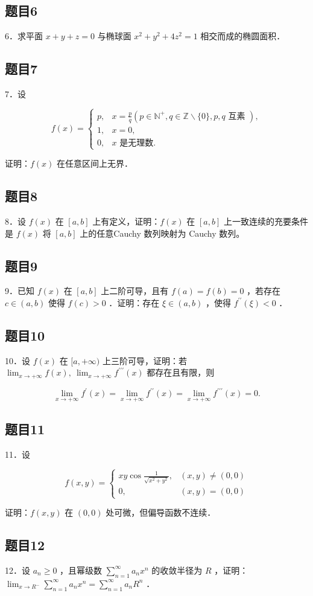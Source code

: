 \documentclass{article}
\begin{document}
\subsection{题目6}
6．求平面 \(x+y+z=0\) 与椭球面 \(x^{2}+y^{2}+4 z^{2}=1\) 相交而成的椭圆面积．

\subsection{题目7}
7．设

\[
f(x)= \begin{cases}p, & x=\frac{p}{q}\left(p \in \mathbb{N}^{+}, q \in \mathbb{Z} \backslash\{0\}, p, q \text { 互素 }\right), \\ 1, & x=0, \\ 0, & x \text { 是无理数. }\end{cases}
\]

证明：\(f(x)\) 在任意区间上无界．

\subsection{题目8}
8．设 \(f(x)\) 在 \([a, b]\) 上有定义，证明：\(f(x)\) 在 \([a, b]\) 上一致连续的充要条件是 \(f(x)\) 将 \([a, b]\) 上的任意Cauchy 数列映射为 Cauchy 数列。

\subsection{题目9}
9．已知 \(f(x)\) 在 \([a, b]\) 上二阶可导，且有 \(f(a)=f(b)=0\) ，若存在 \(c \in(a, b)\) 使得 \(f(c)>0\) ．证明：存在 \(\xi \in(a, b)\) ，使得 \(f^{\prime \prime}(\xi)<0\) ．

\subsection{题目10}
10．设 \(f(x)\) 在 \([a,+\infty)\) 上三阶可导，证明：若 \(\lim _{x \rightarrow+\infty} f(x), ~ \lim _{x \rightarrow+\infty} f^{\prime \prime \prime}(x)\) 都存在且有限，则

\[
\lim _{x \rightarrow+\infty} f^{\prime}(x)=\lim _{x \rightarrow+\infty} f^{\prime \prime}(x)=\lim _{x \rightarrow+\infty} f^{\prime \prime \prime}(x)=0 .
\]

\subsection{题目11}
11．设

\[
f(x, y)= \begin{cases}x y \cos \frac{1}{\sqrt{x^{2}+y^{2}}}, & (x, y) \neq(0,0) \\ 0, & (x, y)=(0,0)\end{cases}
\]

证明：\(f(x, y)\) 在 \((0,0)\) 处可微，但偏导函数不连续．

\subsection{题目12}
12．设 \(a_{n} \geq 0\) ，且幂级数 \(\sum_{n=1}^{\infty} a_{n} x^{n}\) 的收敛半径为 \(R\) ，证明： \(\lim _{x \rightarrow R^{-}} \sum_{n=1}^{\infty} a_{n} x^{n}=\sum_{n=1}^{\infty} a_{n} R^{n}\) ．
\end{document}
